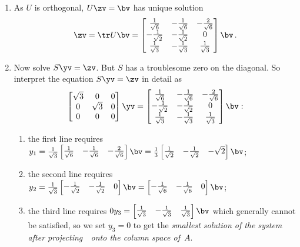 \begin{example}
\begin{solution}
\begin{enumerate}
\item As \(U\) is orthogonal, \(U\zv=\bv\) has unique solution 
\begin{equation*}
\zv=\tr U\bv=\begin{bmatrix} \frac1{\sqrt6}&-\frac1{\sqrt6}&-\frac2{\sqrt6}
\\-\frac1{\sqrt2}&-\frac1{\sqrt2}&0
\\\frac1{\sqrt3}&-\frac1{\sqrt3}&\frac1{\sqrt3} \end{bmatrix}\bv
\,.
\end{equation*}


\item Now solve \(S\yv=\zv\).
But \(S\) has a troublesome zero on the diagonal. 
So interpret the equation \(S\yv=\zv\) in detail as
\begin{equation*}
\begin{bmatrix} \sqrt3&0&0
\\0&\sqrt3&0
\\0&0&0 \end{bmatrix}\yv=\begin{bmatrix} \frac1{\sqrt6}&-\frac1{\sqrt6}&-\frac2{\sqrt6}
\\-\frac1{\sqrt2}&-\frac1{\sqrt2}&0
\\\frac1{\sqrt3}&-\frac1{\sqrt3}&\frac1{\sqrt3} \end{bmatrix}\bv:
\end{equation*}
\begin{enumerate}
\item the first line requires \(y_1=\frac1{\sqrt3}\begin{bmatrix} \frac1{\sqrt6}&-\frac1{\sqrt6}&-\frac2{\sqrt6} \end{bmatrix}\bv
=\frac13\begin{bmatrix} \frac1{\sqrt2}&-\frac1{\sqrt2}&-\sqrt2 \end{bmatrix}\bv\);
\item the second line requires \(y_2=\frac1{\sqrt3}\begin{bmatrix} -\frac1{\sqrt2}&-\frac1{\sqrt2}&0\end{bmatrix}\bv
=\begin{bmatrix} -\frac1{\sqrt6}&-\frac1{\sqrt6}&0\end{bmatrix}\bv\);
\item the third line requires \(0y_3=\begin{bmatrix} \frac1{\sqrt3}&-\frac1{\sqrt3}&\frac1{\sqrt3} \end{bmatrix}\bv\) which generally cannot be satisfied, so we set \(y_3=0\) to get the \emph{smallest solution of the system after projecting~\bv\ onto the column space of~\(A\)}.
\end{enumerate}


\end{enumerate}
\end{solution}
\end{example}
